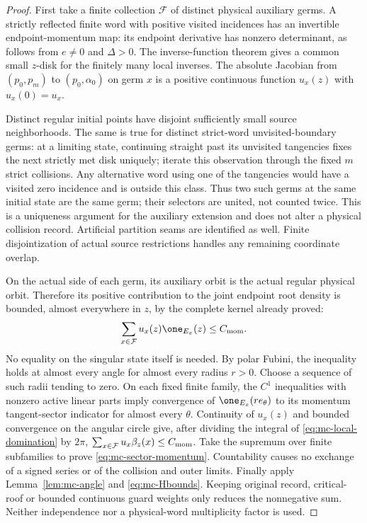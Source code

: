 \begin{proof}
First take a finite collection $\mathcal F$ of distinct physical auxiliary germs.
A strictly reflected finite word with positive visited incidences has
an invertible endpoint-momentum map: its endpoint derivative has
nonzero determinant, as follows from $e\ne0$ and $\Delta>0$.
The inverse-function theorem gives a common small $z$-disk for the
finitely many local inverses. The absolute Jacobian from
$(p_0,p_m)$ to $(p_0,\alpha_0)$ on germ $x$ is a positive continuous
function $u_x(z)$ with $u_x(0)=u_x$.

Distinct regular initial points have disjoint sufficiently small
source neighborhoods. The same is true for distinct strict-word
unvisited-boundary germs: at a limiting state, continuing straight
past its unvisited tangencies fixes the next strictly met disk
uniquely; iterate this observation through the fixed $m$ strict
collisions. Any alternative word using one of the tangencies would
have a visited zero incidence and is outside this class. Thus two
such germs at the same initial state are the same germ; their
selectors are united, not counted twice. This is a uniqueness
argument for the auxiliary extension and does not alter a physical
collision record. Artificial partition seams are identified as well.
Finite disjointization of actual source restrictions handles any
remaining coordinate overlap.

On the actual side of each germ, its auxiliary orbit is the actual
regular physical orbit. Therefore its positive contribution to the
joint endpoint root density is bounded, almost everywhere in $z$, by
the complete kernel already proved:
\begin{equation}\label{eq:mc-local-domination}
  \sum_{x\in\mathcal F}u_x(z)\one_{E_x}(z)
                      \le C_{\rm mom}.
\end{equation}
No equality on the singular state itself is needed. By polar Fubini,
the inequality holds at almost every angle for almost every radius
$r>0$. Choose a sequence of such radii tending to zero. On each
fixed finite family, the $C^1$ inequalities with nonzero active
linear parts imply convergence of $\one_{E_x}(re_\theta)$ to its
momentum tangent-sector indicator for almost every $\theta$.
Continuity of $u_x(z)$ and bounded convergence on the angular circle
give, after dividing the integral of \eqref{eq:mc-local-domination}
by $2\pi$,
$\sum_{x\in\mathcal F}u_x\beta_z(x)\le C_{\rm mom}$.
Take the supremum over finite subfamilies to prove
\eqref{eq:mc-sector-momentum}. Countability causes no exchange of a
signed series or of the collision and outer limits. Finally apply
Lemma~\ref{lem:mc-angle} and \eqref{eq:mc-Hbounds}. Keeping original
record, critical-roof or bounded continuous guard weights only reduces
the nonnegative sum. Neither independence nor a physical-word
multiplicity factor is used.
\end{proof}

